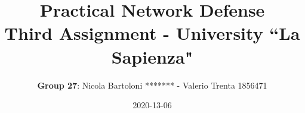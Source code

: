 \documentclass[letterpaper,11pt]{article}
\begin{document}
\title{\textbf{Practical Network Defense}\\ \bigskip \large Third Assignment - University ``La Sapienza"}
\date{2020-13-06}
\author{\textbf{Group 27}: Nicola Bartoloni ******* - Valerio Trenta 1856471}
\maketitle


\newpage


\newpage

\newpage

\newpage

\newpage
\end{document}
